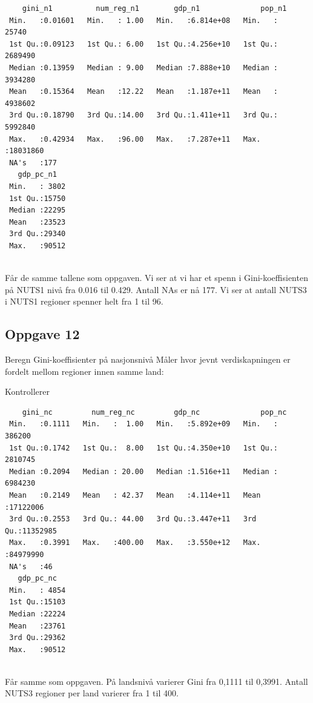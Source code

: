 \documentclass[
  a4paper,
]{article}
\begin{document}
\begin{verbatim}
    gini_n1          num_reg_n1        gdp_n1              pop_n1        
 Min.   :0.01601   Min.   : 1.00   Min.   :6.814e+08   Min.   :   25740  
 1st Qu.:0.09123   1st Qu.: 6.00   1st Qu.:4.256e+10   1st Qu.: 2689490  
 Median :0.13959   Median : 9.00   Median :7.888e+10   Median : 3934280  
 Mean   :0.15364   Mean   :12.22   Mean   :1.187e+11   Mean   : 4938602  
 3rd Qu.:0.18790   3rd Qu.:14.00   3rd Qu.:1.411e+11   3rd Qu.: 5992840  
 Max.   :0.42934   Max.   :96.00   Max.   :7.287e+11   Max.   :18031860  
 NA's   :177                                                             
   gdp_pc_n1    
 Min.   : 3802  
 1st Qu.:15750  
 Median :22295  
 Mean   :23523  
 3rd Qu.:29340  
 Max.   :90512  
                
\end{verbatim}

Får de samme tallene som oppgaven. Vi ser at vi har et spenn i
Gini-koeffisienten på NUTS1 nivå fra 0.016 til 0.429. Antall NAs er nå
177. Vi ser at antall NUTS3 i NUTS1 regioner spenner helt fra 1 til 96.

\subsection{Oppgave 12}\label{oppgave-12}

Beregn Gini-koeffisienter på nasjonsnivå Måler hvor jevnt
verdiskapningen er fordelt mellom regioner innen samme land:

Kontrollerer

\begin{verbatim}
    gini_nc         num_reg_nc         gdp_nc              pop_nc        
 Min.   :0.1111   Min.   :  1.00   Min.   :5.892e+09   Min.   :  386200  
 1st Qu.:0.1742   1st Qu.:  8.00   1st Qu.:4.350e+10   1st Qu.: 2810745  
 Median :0.2094   Median : 20.00   Median :1.516e+11   Median : 6984230  
 Mean   :0.2149   Mean   : 42.37   Mean   :4.114e+11   Mean   :17122006  
 3rd Qu.:0.2553   3rd Qu.: 44.00   3rd Qu.:3.447e+11   3rd Qu.:11352985  
 Max.   :0.3991   Max.   :400.00   Max.   :3.550e+12   Max.   :84979990  
 NA's   :46                                                              
   gdp_pc_nc    
 Min.   : 4854  
 1st Qu.:15103  
 Median :22224  
 Mean   :23761  
 3rd Qu.:29362  
 Max.   :90512  
                
\end{verbatim}

Får samme som oppgaven. På landsnivå varierer Gini fra 0,1111 til
0,3991. Antall NUTS3 regioner per land varierer fra 1 til 400.
\end{document}
